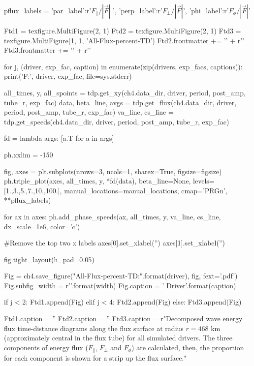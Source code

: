 \begin{pycode}[chapter4]
pflux_labels = {'par_label':r'$F_\parallel / |\vec{F}|$ ', 
                'perp_label':r'$F_\perp / |\vec{F}|$',
                'phi_label':r'$F_\phi / |\vec{F}|$'}

Ftd1 = texfigure.MultiFigure(2, 1)
Ftd2 = texfigure.MultiFigure(2, 1)
Ftd3 = texfigure.MultiFigure(1, 1, 'All-Flux-percent-TD')
Ftd2.frontmatter += '\n' + r'\ContinuedFloat'
Ftd3.frontmatter += '\n' + r'\ContinuedFloat'

for j, (driver, exp_fac, caption) in enumerate(zip(drivers, exp_facs, captions)):
    print('F:', driver, exp_fac, file=sys.stderr)
    
    
    all_times, y, all_spoints = tdp.get_xy(ch4.data_dir, driver, period, post_amp, tube_r, exp_fac)
    data, beta_line, avgs = tdp.get_flux(ch4.data_dir, driver, period, post_amp, tube_r, exp_fac)
    va_line, cs_line = tdp.get_speeds(ch4.data_dir, driver, period, post_amp, tube_r, exp_fac)
    
    
    fd = lambda args: [a.T for a in args]
    
    ph.xxlim = -150
    
    fig, axes = plt.subplots(nrows=3, ncols=1, sharex=True, figsize=figsize)
    ph.triple_plot(axes, all_times, y, *fd(data), beta_line=None,
    levels=[1.,3.,5.,7.,10.,100.], manual_locations=manual_locations, cmap='PRGn', **pflux_labels)
    
    for ax in axes:
        ph.add_phase_speeds(ax, all_times, y, va_line, cs_line, dx_scale=1e6, color='c')
    
    #Remove the top two x labels
    axes[0].set_xlabel('')
    axes[1].set_xlabel('')
    
    fig.tight_layout(h_pad=0.05)
    
    Fig = ch4.save_figure("All-Flux-percent-TD:{}".format(driver), fig, fext='.pdf')
    Fig.subfig_width = r'{}\columnwidth'.format(width)
    Fig.caption = '{} Driver'.format(caption)
    
    if j < 2:
        Ftd1.append(Fig)
    elif j < 4:
        Ftd2.append(Fig)
    else:
        Ftd3.append(Fig)


Ftd1.caption = ''
Ftd2.caption = ''
Ftd3.caption = r"Decomposed wave energy flux time-distance diagrams along the flux surface at radius $r = 468$ km (approximately central in the flux tube) for all simulated drivers. The three components of energy flux ($F_\parallel$, $F_\perp$ and $F_\phi$) are calculated, then, the proportion for each component is shown for a strip up the flux surface."
\end{pycode}

